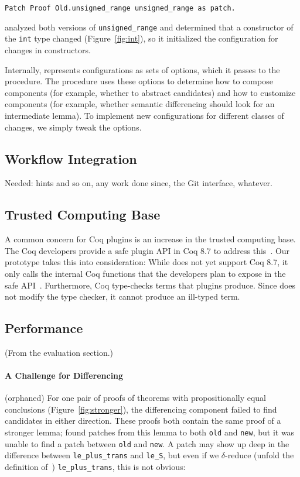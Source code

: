 \begin{lstlisting}[language=ml4]
  Patch Proof Old.unsigned_range unsigned_range as patch.
\end{lstlisting}
\sysname analyzed both versions of \lstinline{unsigned_range} and determined 
that a constructor of the \lstinline{int} type changed (Figure~\ref{fig:int}),
so it initialized the configuration for changes in constructors.

Internally, \sysname represents configurations as sets of options,
which it passes to the procedure. The procedure uses these options to determine
how to compose components (for example, whether to abstract candidates) 
and how to customize components (for example, whether semantic differencing should look for an intermediate lemma).
To implement new configurations for different classes of changes, we simply tweak the options.

\subsection{Workflow Integration}

Needed: hints and so on, any work done since, the Git interface, whatever.

\subsection{Trusted Computing Base}
\label{sec:tcb}

A common concern for Coq plugins is an increase in the trusted computing base.
The Coq developers provide a safe plugin API in Coq 8.7 to address this~\cite{coq87news}.
Our prototype takes this into consideration:
While \sysname does not yet support Coq 8.7, it only calls the internal Coq functions that the 
developers plan to expose in the safe API~\cite{coqPR}.
Furthermore, Coq type-checks terms that plugins produce.
Since \sysname does not modify the type checker, it cannot produce an ill-typed term.

\subsection{Performance}

(From the evaluation section.)


\paragraph{A Challenge for Differencing}  (orphaned)
For one pair of proofs of theorems 
with propositionally equal conclusions (Figure~\ref{fig:stronger}),
the differencing component failed to find candidates in either direction.
These proofs both contain the same proof of a stronger lemma;
\sysname found patches from this lemma to
both \lstinline{old} and \lstinline{new},
but it was unable to find a patch between \lstinline{old} and \lstinline{new}.
A patch may show up deep in the difference between \lstinline{le_plus_trans}
and \lstinline{le_S}, but even if we $\delta$-reduce (unfold the definition of~\cite{equality}) \lstinline{le_plus_trans}, this is not obvious:

